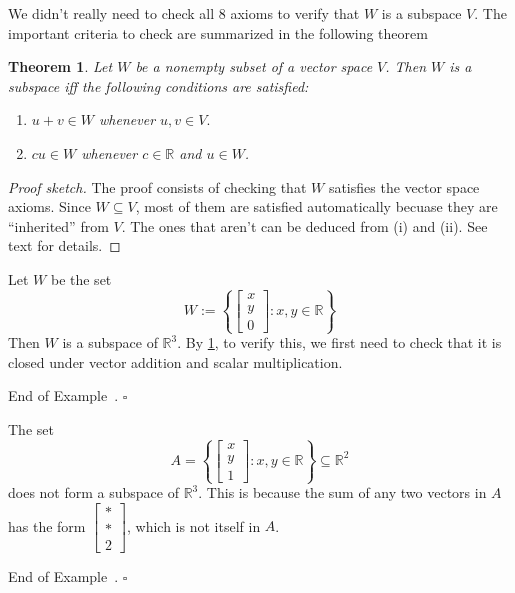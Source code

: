 \documentclass[10pt]{article}
\newtheorem{theorem}{Theorem}
\theoremstyle{definition}
\newtheorem{example}[theorem]{Example}
\renewenvironment{example}
{\begin{oldexample}}
  {\par\smallskip\hfill   End of Example~\theexample. $\square$    \par\end{oldexample}}
\newcommand{\R}{\mathbb{R}}           %
\begin{document}
We didn't really need to check all 8 axioms to verify that $W$ is a subspace
$V$. The important criteria to check are summarized in the following theorem
\begin{theorem}
  \label{thm:subspace-criteria-a}
  Let $W$ be a nonempty subset of a vector space $V$. Then $W$ is a subspace
  iff the following conditions are satisfied:
  \begin{enumerate}[label=(\roman*.)]
    \item $u+v\in W$ whenever $u,v\in V.$
    \item $cu\in W$ whenever $c\in \R$ and $u\in W$.
  \end{enumerate}
\end{theorem}
\begin{proof}[Proof sketch]
  The proof consists of checking that $W$ satisfies the vector space axioms.
  Since $W\subseteq V$, most of them are satisfied automatically becuase they
  are ``inherited'' from $V$. The ones that aren't can be deduced from (i) and
  (ii). See text for details.
\end{proof}



\begin{example}
  Let $W$ be the set
  \begin{equation*}
    W:= \left\{
      \begin{bmatrix}
        x\\y\\0
      \end{bmatrix}: x,y\in \R
    \right\} 
  \end{equation*}
  Then $W$ is a subspace of $\R^{3}$. By \cref{thm:subspace-criteria-a}, to
  verify this, we first need to check that it is closed under vector addition
  and scalar multiplication.
\end{example}

\begin{example}
  The set 
  \begin{equation*}
    A=\left\{\begin{bmatrix}
        x\\y\\1
      \end{bmatrix}: x,y\in \R\right\} \subseteq \R^{2}
  \end{equation*}
  does not form a subspace of $\R^{3}$. This is because the sum of any two
  vectors in $A$ has the form
  $\begin{bmatrix}
    *\\ * \\ 2
  \end{bmatrix}$,
  which is not itself in $A$.
\end{example}
\end{document}
